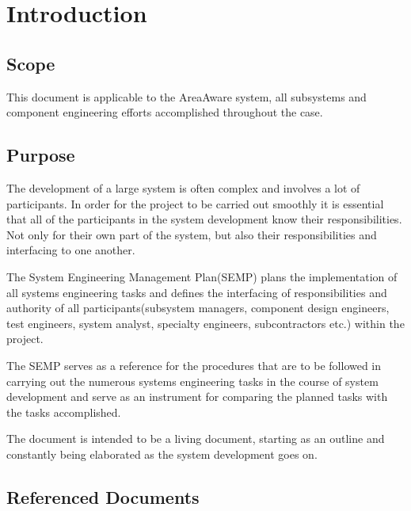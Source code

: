 %
\thispagestyle{fancy}
\chapter{Introduction}
\label{chp:intro}


\section{Scope}
This document is applicable to the AreaAware system, all subsystems and component engineering efforts accomplished throughout the case.

\section{Purpose}
The development of a large system is often complex and involves a lot of participants.
In order for the project to be carried out smoothly it is essential that all of the participants in the system development know their responsibilities.
Not only for their own part of the system, but also their responsibilities and interfacing to one another.

The System Engineering Management Plan(SEMP) plans the implementation of all systems engineering tasks and defines the interfacing of responsibilities and authority of all participants(subsystem managers, component design engineers, test engineers, system analyst, specialty engineers, subcontractors etc.) within the project.

The SEMP serves as a reference for the procedures that are to be followed in carrying out the numerous systems engineering tasks in the course of system development and serve as an instrument for comparing the planned tasks with the tasks accomplished.

The document is intended to be a living document, starting as an outline and constantly being elaborated as the system development goes on.

\section{Referenced Documents}



